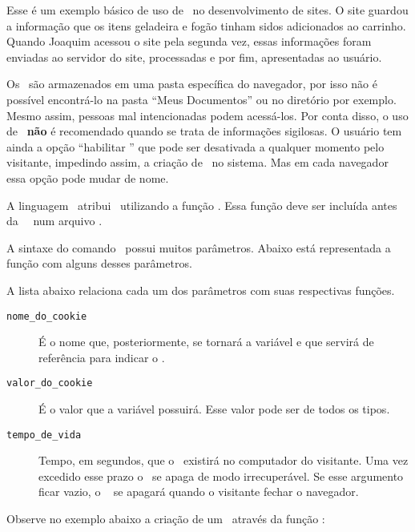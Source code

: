 Esse é um exemplo básico de uso de \cookies~no desenvolvimento de sites. O site guardou a informação 
que os itens geladeira e fogão tinham sidos adicionados ao carrinho. Quando Joaquim acessou o site 
pela segunda vez, essas informações foram enviadas ao servidor do site, processadas e por fim, 
apresentadas ao usuário.

Os \cookies~são armazenados em uma pasta específica do navegador, por isso não é possível encontrá-lo 
na pasta ``Meus Documentos'' ou no diretório  por exemplo. Mesmo assim, 
pessoas mal intencionadas podem acessá-los. Por conta disso, o uso de \cookies~\textbf{não} é 
recomendado quando se trata de informações sigilosas. O usuário tem ainda a opção ``habilitar \cookies'' 
que pode ser desativada a qualquer momento pelo visitante, impedindo assim, a criação de \cookies~no 
sistema. Mas em cada navegador essa opção pode mudar de nome. 

A linguagem \php~atribui \cookies~utilizando a função \funcaosetcookie. Essa função deve ser incluída antes 
da \tag~\taghtml~num arquivo \phpextensao.

A sintaxe do comando \funcaosetcookie~possui muitos parâmetros. Abaixo está representada a função
com alguns desses parâmetros. 



A lista abaixo relaciona cada um dos parâmetros com suas respectivas funções.

\begin{description}
  \item [\texttt{nome\_do\_cookie}] É o nome que, posteriormente, se tornará a variável e que 
  servirá de referência para indicar o \cookie.
  \item [\texttt{valor\_do\_cookie}] É o valor que a variável possuirá. Esse valor pode ser de todos 
  os tipos.
  \item [\texttt{tempo\_de\_vida}] Tempo, em segundos, que o \cookie~existirá no computador do visitante. 
  Uma vez excedido esse prazo o \cookie~se apaga de modo irrecuperável. Se esse argumento ficar vazio, o 
  \cookie~ se apagará quando o visitante fechar o navegador. 
\end{description}

Observe no exemplo abaixo a criação de um \cookie~através da função \funcaosetcookie:



